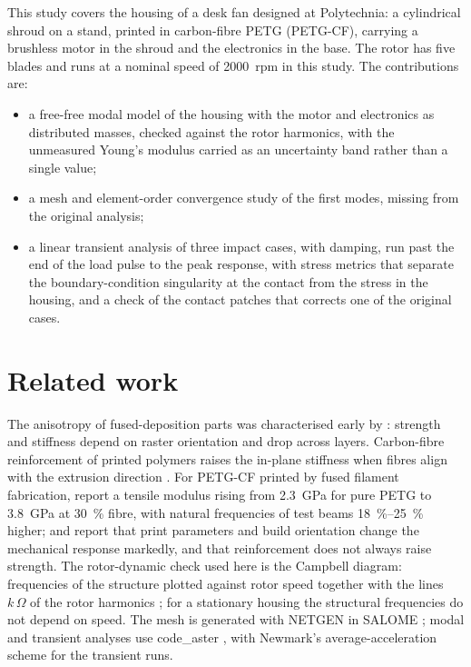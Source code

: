 \documentclass[11pt]{article}
\begin{document}
This study covers the housing of a desk fan designed at Polytechnia: a cylindrical shroud on a stand, printed in
carbon-fibre PETG (PETG-CF), carrying a brushless motor in the shroud and the electronics in the base. The rotor has five
blades and runs at a nominal speed of \SI{2000}{rpm} in this study. The contributions are:
\begin{itemize}
  \item a free-free modal model of the housing with the motor and electronics as distributed masses, checked against
    the rotor harmonics, with the unmeasured Young's modulus carried as an uncertainty band rather than a single value;
  \item a mesh and element-order convergence study of the first modes, missing from the original analysis;
  \item a linear transient analysis of three impact cases, with damping, run past the end of the load pulse to the
    peak response, with stress metrics that separate the boundary-condition singularity at the contact from the stress
    in the housing, and a check of the contact patches that corrects one of the original cases.
\end{itemize}

\section{Related work}

The anisotropy of fused-deposition parts was characterised early by \citet{ahn2002}: strength and stiffness depend on
raster orientation and drop across layers. Carbon-fibre reinforcement of printed polymers raises the in-plane stiffness
when fibres align with the extrusion direction \citep{tekinalp2014}. For PETG-CF printed by fused filament fabrication,
\citet{prabhakaran2025} report a tensile modulus rising from \SI{2.3}{GPa} for pure PETG to \SI{3.8}{GPa} at
\SI{30}{\%} fibre, with natural frequencies of test beams \SIrange{18}{25}{\%} higher; \citet{batista2023} and
\citet{kohn2021} report that print parameters and build orientation change the mechanical response markedly, and that
reinforcement does not always raise strength. The rotor-dynamic check used here is the Campbell diagram: frequencies of
the structure plotted against rotor speed together with the lines $k\,\Omega$ of the rotor harmonics
\citep{genta2005}; for a stationary housing the structural frequencies do not depend on speed. The mesh is generated
with NETGEN \citep{schoberl1997} in SALOME \citep{salome}; modal and transient analyses use code\_aster
\citep{codeaster}, with Newmark's average-acceleration scheme \citep{newmark1959} for the transient runs.
\end{document}

